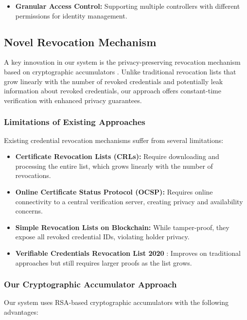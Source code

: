 \documentclass[lettersize,journal]{IEEEtran}
\begin{document}
\begin{itemize}
\begin{itemize}
    \item \textbf{Granular Access Control:} Supporting multiple controllers with different permissions for identity management.
\end{itemize}

\subsection{Novel Revocation Mechanism}
A key innovation in our system is the privacy-preserving revocation mechanism based on cryptographic accumulators \cite{AccumulatorCrypto2024}. Unlike traditional revocation lists that grow linearly with the number of revoked credentials and potentially leak information about revoked credentials, our approach offers constant-time verification with enhanced privacy guarantees.

\subsubsection{Limitations of Existing Approaches}
Existing credential revocation mechanisms suffer from several limitations:

\begin{itemize}
    \item \textbf{Certificate Revocation Lists (CRLs):} Require downloading and processing the entire list, which grows linearly with the number of revocations.
    
    \item \textbf{Online Certificate Status Protocol (OCSP):} Requires online connectivity to a central verification server, creating privacy and availability concerns.
    
    \item \textbf{Simple Revocation Lists on Blockchain:} While tamper-proof, they expose all revoked credential IDs, violating holder privacy.
    
    \item \textbf{Verifiable Credentials Revocation List 2020} \cite{RevocationList2020}: Improves on traditional approaches but still requires larger proofs as the list grows.
\end{itemize}

\subsubsection{Our Cryptographic Accumulator Approach}
Our system uses RSA-based cryptographic accumulators with the following advantages:


\end{itemize}
\end{document}
